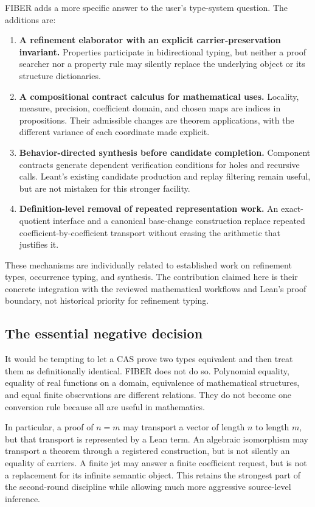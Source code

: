 \documentclass[11pt,letterpaper]{article}
\theoremstyle{definition}\newtheorem{definition}[theorem]{Definition}
\begin{document}
FIBER adds a more specific answer to the user's type-system question. The additions are:
\begin{enumerate}[label=\textbf{\arabic*.}]
\item \textbf{A refinement elaborator with an explicit carrier-preservation invariant.} Properties participate in bidirectional typing, but neither a proof searcher nor a property rule may silently replace the underlying object or its structure dictionaries.
\item \textbf{A compositional contract calculus for mathematical uses.} Locality, measure, precision, coefficient domain, and chosen maps are indices in propositions. Their admissible changes are theorem applications, with the different variance of each coordinate made explicit.
\item \textbf{Behavior-directed synthesis before candidate completion.} Component contracts generate dependent verification conditions for holes and recursive calls. Leant's existing candidate production and replay filtering remain useful, but are not mistaken for this stronger facility.
\item \textbf{Definition-level removal of repeated representation work.} An exact-quotient interface and a canonical base-change construction replace repeated coefficient-by-coefficient transport without erasing the arithmetic that justifies it.
\end{enumerate}
These mechanisms are individually related to established work on refinement types, occurrence typing, and synthesis. The contribution claimed here is their concrete integration with the reviewed mathematical workflows and Lean's proof boundary, not historical priority for refinement typing.

\subsection{The essential negative decision}
It would be tempting to let a CAS prove two types equivalent and then treat them as definitionally identical. FIBER does not do so. Polynomial equality, equality of real functions on a domain, equivalence of mathematical structures, and equal finite observations are different relations. They do not become one conversion rule because all are useful in mathematics.

In particular, a proof of $n=m$ may transport a vector of length $n$ to length $m$, but that transport is represented by a Lean term. An algebraic isomorphism may transport a theorem through a registered construction, but is not silently an equality of carriers. A finite jet may answer a finite coefficient request, but is not a replacement for its infinite semantic object. This retains the strongest part of the second-round discipline while allowing much more aggressive source-level inference.
\end{document}
